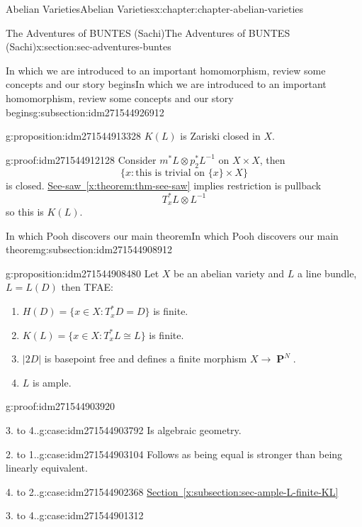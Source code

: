 \documentclass[oneside,10pt,]{book}
\numberwithin{equation}{section}
\DeclareMathOperator{\PP}{\mathbf{P}}
\begin{document}
\begin{chapterptx}{Abelian Varieties}{}{Abelian Varieties}{}{}{x:chapter:chapter-abelian-varieties}
\begin{sectionptx}{The Adventures of BUNTES (Sachi)}{}{The Adventures of BUNTES (Sachi)}{}{}{x:section:sec-adventures-buntes}
\begin{subsectionptx}{In which we are introduced to an important homomorphism, review some concepts and our story begins}{}{In which we are introduced to an important homomorphism, review some concepts and our story begins}{}{}{g:subsection:idm271544926912}
\begin{proposition}{}{}{g:proposition:idm271544913328}
\(K(L)\) is Zariski closed in \(X\).%
\end{proposition}
\begin{proofptx}{}{g:proof:idm271544912128}
Consider \(m^* L \otimes p_2^*L^{-1}\) on \(X\times X\), then%
\begin{equation*}
\{x : \text{this is trivial on }\{x\}\times X\}
\end{equation*}
is closed. \hyperref[x:theorem:thm-see-saw]{See-saw~\ref{x:theorem:thm-see-saw}} implies restriction is pullback%
\begin{equation*}
T_x^*L \otimes L^{-1}
\end{equation*}
so this is \(K(L)\).%
\end{proofptx}
\end{subsectionptx}
%
%
\typeout{************************************************}
\typeout{************************************************}
%
\begin{subsectionptx}{In which Pooh discovers our main theorem}{}{In which Pooh discovers our main theorem}{}{}{g:subsection:idm271544908912}
\begin{proposition}{}{}{g:proposition:idm271544908480}%
Let \(X\) be an abelian variety and \(L\) a line bundle, \(L = L(D)\) then TFAE:%
\begin{enumerate}
\item{}\(H(D) = \{x\in X: T_x^*D  = D \}\) is finite.%
\item{}\(K(L) = \{x\in X: T_x^*L  \cong L \}\) is finite.%
\item{}\(|2D|\) is basepoint free and defines a finite morphism \(X\to \PP^N\).%
\item{}\(L\) is ample.%
\end{enumerate}
%
\end{proposition}
\begin{proofptx}{}{g:proof:idm271544903920}
\begin{case}{}{3. to 4..}{g:case:idm271544903792}
Is algebraic geometry.%
\end{case}
\begin{case}{}{2. to 1..}{g:case:idm271544903104}
Follows as being equal is stronger than being linearly equivalent.%
\end{case}
\begin{case}{}{4. to 2..}{g:case:idm271544902368}
\hyperref[x:subsection:sec-ample-L-finite-KL]{Section~\ref{x:subsection:sec-ample-L-finite-KL}}%
\end{case}
\begin{case}{}{3. to 4..}{g:case:idm271544901312}

\end{case}
\end{proofptx}
\end{subsectionptx}
\end{sectionptx}
\end{chapterptx}
\end{document}
